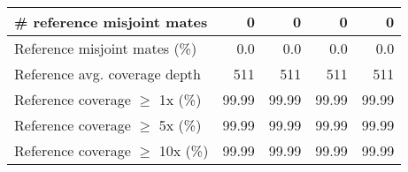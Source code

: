 \documentclass[12pt,a4paper]{article}
\begin{document}
\begin{table}[ht]
\begin{center}
\begin{tabular}{|l*{4}{|r}|}
\# reference misjoint mates & 0 & 0 & 0 & 0 \\ \hline
Reference misjoint mates (\%) & 0.0 & 0.0 & 0.0 & 0.0 \\ \hline
Reference avg. coverage depth & 511 & 511 & 511 & 511 \\ \hline
Reference coverage $\geq$ 1x (\%) & 99.99 & 99.99 & 99.99 & 99.99 \\ \hline
Reference coverage $\geq$ 5x (\%) & 99.99 & 99.99 & 99.99 & 99.99 \\ \hline
Reference coverage $\geq$ 10x (\%) & 99.99 & 99.99 & 99.99 & 99.99 \\ \hline
\end{tabular}
\end{center}
\end{table}
\end{document}
